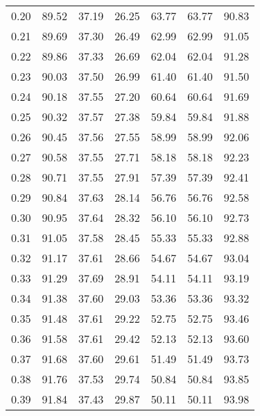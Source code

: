 \begin{tabular}{|c|c|c|c|c|c|c|}
      0.20 &     89.52 &     37.19 &      26.25 &   63.77 &      63.77 &         90.83 \\
      0.21 &     89.69 &     37.30 &      26.49 &   62.99 &      62.99 &         91.05 \\
      0.22 &     89.86 &     37.33 &      26.69 &   62.04 &      62.04 &         91.28 \\
      0.23 &     90.03 &     37.50 &      26.99 &   61.40 &      61.40 &         91.50 \\
      0.24 &     90.18 &     37.55 &      27.20 &   60.64 &      60.64 &         91.69 \\
      0.25 &     90.32 &     37.57 &      27.38 &   59.84 &      59.84 &         91.88 \\
      0.26 &     90.45 &     37.56 &      27.55 &   58.99 &      58.99 &         92.06 \\
      0.27 &     90.58 &     37.55 &      27.71 &   58.18 &      58.18 &         92.23 \\
      0.28 &     90.71 &     37.55 &      27.91 &   57.39 &      57.39 &         92.41 \\
      0.29 &     90.84 &     37.63 &      28.14 &   56.76 &      56.76 &         92.58 \\
      0.30 &     90.95 &     37.64 &      28.32 &   56.10 &      56.10 &         92.73 \\
      0.31 &     91.05 &     37.58 &      28.45 &   55.33 &      55.33 &         92.88 \\
      0.32 &     91.17 &     37.61 &      28.66 &   54.67 &      54.67 &         93.04 \\
      0.33 &     91.29 &     37.69 &      28.91 &   54.11 &      54.11 &         93.19 \\
      0.34 &     91.38 &     37.60 &      29.03 &   53.36 &      53.36 &         93.32 \\
      0.35 &     91.48 &     37.61 &      29.22 &   52.75 &      52.75 &         93.46 \\
      0.36 &     91.58 &     37.61 &      29.42 &   52.13 &      52.13 &         93.60 \\
      0.37 &     91.68 &     37.60 &      29.61 &   51.49 &      51.49 &         93.73 \\
      0.38 &     91.76 &     37.53 &      29.74 &   50.84 &      50.84 &         93.85 \\
      0.39 &     91.84 &     37.43 &      29.87 &   50.11 &      50.11 &         93.98 \\

\end{tabular}
